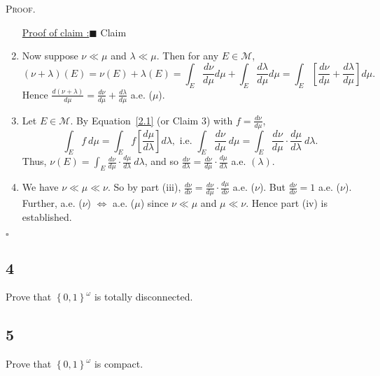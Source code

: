 \documentclass[12pt]{article}
\newcounter{ProofCounter}
\newcounter{ClaimCounter}[ProofCounter]
\newenvironment{Proof}{\stepcounter{ProofCounter}\textsc{Proof.}}{\hfill$\square$}
\newenvironment{claimproof}[1]{\par\noindent\underline{Proof of claim \theClaimCounter:}\space#1}{\hfill $\blacksquare$ Claim \theClaimCounter}
\begin{document}
\begin{Proof}
\begin{enumerate}[label = (\roman*)]
\begin{claimproof}
        \end{claimproof}
      \item Now suppose $\nu \ll \mu$ and $\lambda \ll \mu$. Then for any $E \in \mathcal{M}$,
        \[ 
          (\nu + \lambda)(E) = \nu(E) + \lambda(E) = \int_{E}\frac{d\nu}{d\mu}d\mu + \int_{E}\frac{d\lambda}{d\mu}d\mu = \int_{E} 
          \left[ \frac{d\nu}{d\mu} + \frac{d\lambda}{d\mu} \right]d\mu. 
        \]
        Hence $\frac{d(\nu + \lambda)}{d\mu} = \frac{d\nu}{d\mu} + \frac{d\lambda}{d\mu}$ a.e. ($\mu$).
      \item Let $E \in \mathcal{M}$. By Equation~\eqref{2.1} (or Claim 3) with $f = \frac{d\nu}{d\mu}$,
        \[ 
          \int_{E}f\ d\mu = \int_{E}f\left[ \frac{d\mu}{d\lambda} \right]d\lambda, \text{ i.e. } \int_{E}\frac{d\nu}{d\mu}\ d\mu = \int_{E}
          \frac{d\nu}{d\mu}\cdot\frac{d\mu}{d\lambda}\ d\lambda. 
        \]
        Thus, $\nu(E) = \int_{E}\frac{d\nu}{d\mu}\cdot \frac{d\mu}{d\lambda}\ d\lambda$, and so $\frac{d\nu}{d\lambda} = \frac{d\nu}{d\mu}\cdot
        \frac{d\mu}{d\lambda}$ a.e. $(\lambda)$.
      \item We have $\nu \ll \mu \ll \nu$. So by part (iii), $\frac{d\nu}{d\nu} = \frac{d\nu}{d\mu}\cdot \frac{d\mu}{d\nu}$ a.e. ($\nu$). But
        $\frac{d\nu}{d\nu} = 1$ a.e. ($\nu$). Further, a.e. ($\nu$) $\Leftrightarrow$ a.e. ($\mu$) since $\nu \ll \mu$ and $\mu \ll \nu$. Hence part
        (iv) is established.
  \end{enumerate}
\end{Proof}


\newpage 
\subsection*{4}
\begin{tcolorbox}
  Prove that $\left\{ 0,1 \right\}^{\omega}$ is totally disconnected.
\end{tcolorbox}

\newpage 
\subsection*{5}
\begin{tcolorbox}
  Prove that $\left\{ 0,1 \right\}^{\omega}$ is compact.
\end{tcolorbox}
\end{document}
